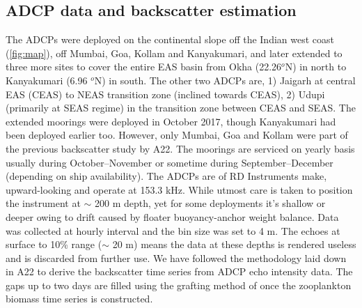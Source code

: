 \documentclass{article}
\begin{document}
	
	\subsection{ADCP data and backscatter estimation}
    The ADCPs were deployed on the continental slope off the Indian west coast (\cref{fig:map}), off Mumbai, Goa, Kollam and Kanyakumari, and later extended to three more sites to cover the entire EAS basin from Okha (22.26$^o$N) in north to Kanyakumari (6.96 $^o$N) in south. The other two ADCPs are, 1) Jaigarh at central EAS (CEAS) to NEAS transition zone (inclined towards CEAS), 2) Udupi (primarily at SEAS regime) in the transition zone between CEAS and SEAS. The extended moorings were deployed in October 2017, though Kanyakumari had been deployed earlier too. However, only Mumbai, Goa and Kollam were part of the previous backscatter study by A22. The moorings are serviced on yearly basis usually during October--November or sometime during September--December (depending on ship availability). The ADCPs are of RD Instruments make, upward-looking and operate at 153.3 kHz. While utmost care is taken to position the instrument at  $\sim$ 200 m depth, yet for some deployments it's shallow or deeper owing to drift caused by floater buoyancy-anchor weight balance. Data was collected at hourly interval and the bin size was set to 4 m. The echoes at surface to 10\% range ($\sim$ 20 m) means the data at these depths is rendered useless and is discarded from further use.  We have followed the methodology laid down in A22 to derive the backscatter time series from ADCP echo intensity data. The gaps up to two days are filled using the grafting method of \citet{mukhopadhyay2017st} once the zooplankton biomass time series is constructed.
    
\end{document}
